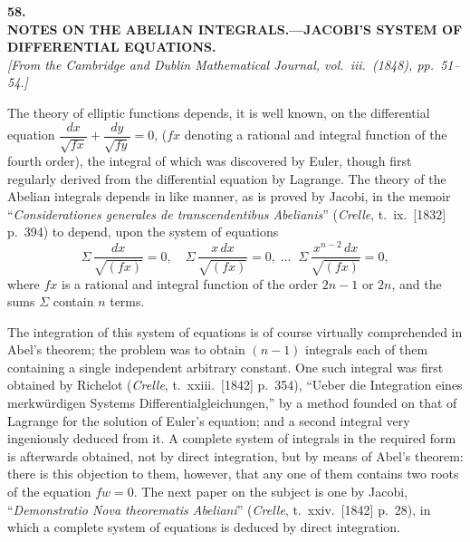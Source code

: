 \documentclass[11pt]{article}
\begin{document}
\bigskip

\begin{center}
\textbf{\large 58.}\\[0.7em]
\textbf{\large NOTES ON THE ABELIAN INTEGRALS.---JACOBI'S SYSTEM OF}\\[0.3em]
\textbf{\large DIFFERENTIAL EQUATIONS.}\\[0.5em]
\textit{[From the Cambridge and Dublin Mathematical Journal, vol.~iii.\ (1848), pp.~51--54.]}
\end{center}

\medskip

\noindent The theory of elliptic functions depends, it is well known, on the differential
equation $\dfrac{d x}{\sqrt{f x}} + \dfrac{d y}{\sqrt{f y}} = 0$, ($f x$ denoting a rational and integral function of the fourth
order), the integral of which was discovered by Euler, though first regularly derived
from the differential equation by Lagrange. The theory of the Abelian integrals depends
in like manner, as is proved by Jacobi, in the memoir ``\emph{Considerationes generales
de transcendentibus Abelianis}'' (\emph{Crelle}, t.~ix.\ [1832] p.~394) to depend, upon the system
of equations
\[
\Sigma\, \frac{d x}{\sqrt{(f x)}} = 0,\quad \Sigma\, \frac{x\, d x}{\sqrt{(f x)}} = 0,\;\ldots\;\; \Sigma\, \frac{x^{n - 2}\, d x}{\sqrt{(f x)}} = 0, \tag{1}
\]
where $f x$ is a rational and integral function of the order $2 n - 1$ or $2 n$, and the sums
$\Sigma$ contain $n$ terms.

\medskip
The integration of this system of equations is of course virtually comprehended in
Abel's theorem; the problem was to obtain $(n - 1)$ integrals each of them containing
a single independent arbitrary constant. One such integral was first obtained by
Richelot (\emph{Crelle}, t.~xxiii.\ [1842] p.~354), ``Ueber die Integration eines merkw\"urdigen Sys\-tems
Differentialgleichungen,'' by a method founded on that of Lagrange for the solution
of Euler's equation; and a second integral very ingeniously deduced from it. A complete
system of integrals in the required form is afterwards obtained, not by direct integration,
but by means of Abel's theorem: there is this objection to them, however, that any one
of them contains two roots of the equation $f w = 0$. The next paper on the subject
is one by Jacobi, ``\emph{Demonstratio Nova theorematis Abeliani}'' (\emph{Crelle}, t.~xxiv.\ [1842]
p.~28), in which a complete system of equations is deduced by direct integration.
\end{document}
